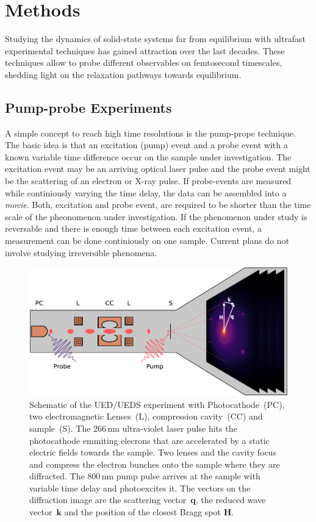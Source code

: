 \section{Methods}
Studying the dynamics of solid-state systems far from equilibrium with ultrafast experimental techniques has gained attraction over the last decades.
These techniques allow to probe different observables on femtosecond timescales, shedding light on the relaxation pathways towards equilibrium.

\subsection{Pump-probe Experiments}
A simple concept to reach high time resolutions is the pump-prope technique.
The basic idea is that an excitation (pump) event and a probe event with a known variable time difference occur on the sample under investigation.
The excitation event may be an arriving optical laser pulse and the probe event might be the scattering of an electron or X-ray pulse.
If probe-events are measured while continiously varying the time delay, the data can be assembled into a \emph{movie}.
Both, excitation and probe event, are required to be shorter than the time scale of the pheonomenon under investigation.
If the phenomenon under study is reversable and there is enough time between each excitation event, a measurement can be done continiously on one sample.
Current plans do not involve studying irreversible phenomena.

\begin{figure}[!t]
	\includegraphics[width=\columnwidth]{figs/ued.pdf}
	\caption{Schematic of the UED/UEDS experiment with Photocathode~(PC), two electromagnetic Lenses~(L), compression cavity~(CC) and sample~(S). The 266\,nm ultra-violet laser pulse hits the photocathode emmiting elecrons that are accelerated by a static electric fields towards the sample. Two lenses and the cavity focus and compress the electron bunches onto the sample where they are diffracted. The 800\,nm pump pulse arrives at the sample with variable time delay and photoexcites it. The vectors on the diffraction image are the scattering vector~$\mathbf{q}$, the reduced wave vector~$\mathbf{k}$ and the position of the closest Bragg spot $\mathbf{H}$.}
	\label{fig:ued}
\end{figure}

